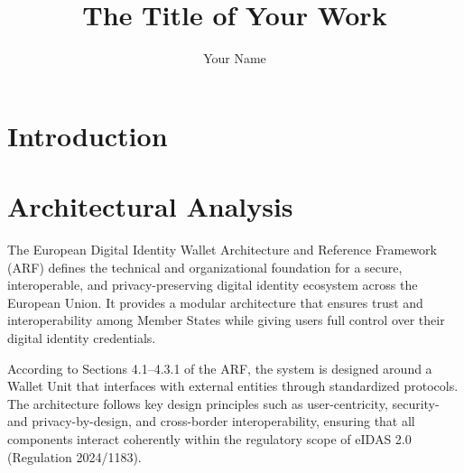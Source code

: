 \documentclass[sigconf,balance,nonacm,authordraft]{acmart}
\begin{document}
\begin{acronym}
\end{acronym}

\title{The Title of Your Work}

\author{Your Name}


\begin{abstract}

\end{abstract}


\maketitle

\section{Introduction}
\label{sec:intro}


\section{Architectural Analysis}
\label{sec:ArchitecturalAnalysis}
The European Digital Identity Wallet Architecture and Reference Framework (ARF) defines the technical and organizational foundation for a secure, interoperable, and privacy-preserving digital identity ecosystem across the European Union.
It provides a modular architecture that ensures trust and interoperability among Member States while giving users full control over their digital identity credentials.

According to Sections 4.1–4.3.1 of the ARF, the system is designed around a Wallet Unit that interfaces with external entities through standardized protocols.
The architecture follows key design principles such as user-centricity, security- and privacy-by-design, and cross-border interoperability, ensuring that all components interact coherently within the regulatory scope of eIDAS 2.0 (Regulation 2024/1183).
\end{document}
